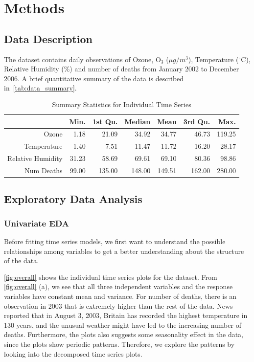 \documentclass{article}\usepackage[]{graphicx}\usepackage[]{color}
\begin{document}
\section{Methods} \label{s:methods}
\subsection{Data Description}

The dataset contains daily observations of Ozone, O$_3$ ($\mu g / m^3$), Temperature ($^{\circ}$C), Relative Humidity (\%) and number of deaths from January 2002 to December 2006. A brief quantitative summary of the data is described in~\autoref{tab:data_summary}.

\begin{table}[ht]
\centering
\begin{tabular}{rrrrrrr}
  \hline
 & Min. & 1st Qu. & Median & Mean & 3rd Qu. & Max. \\ 
  \hline
Ozone & 1.18 & 21.09 & 34.92 & 34.77 & 46.73 & 119.25 \\ 
  Temperature & -1.40 & 7.51 & 11.47 & 11.72 & 16.20 & 28.17 \\ 
  Relative Humidity & 31.23 & 58.69 & 69.61 & 69.10 & 80.36 & 98.86 \\ 
  Num Deaths & 99.00 & 135.00 & 148.00 & 149.51 & 162.00 & 280.00 \\ 
   \hline
\end{tabular}
\caption{Summary Statistics for Individual Time Series} 
\label{tab:data_summary}
\end{table}


\subsection{Exploratory Data Analysis} \label{ssec:EDA}
\subsubsection{Univariate EDA}

Before fitting time series models, we first want to understand the possible relationships among variables to get a better understanding about the structure of the data.

\autoref{fig:overall} shows the individual time series plots for the dataset. From \autoref{fig:overall} (a), we see that all three independent variables and the response variables have constant mean and variance. For number of deaths, there is an observation in 2003 that is extremely higher than the rest of the data. News reported that in August 3, 2003, Britain has recorded the highest temperature in 130 years, and the unusual weather might have led to the increasing number of deaths. Furthermore, the plots also suggests some seasonality effect in the data, since the plots show periodic patterns. Therefore, we explore the patterns by looking into the decomposed time series plots. 
\end{document}
